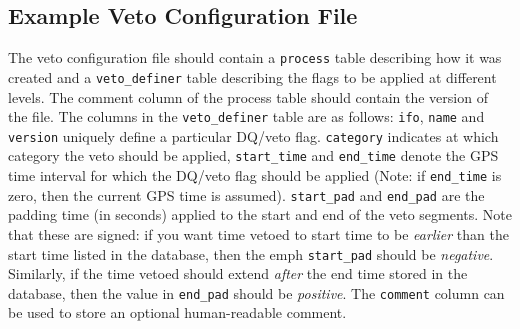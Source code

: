 {\subsection{Example Veto Configuration File}

The veto configuration file should contain a \verb|process| table
describing how it was created and a \verb|veto_definer| table
describing the flags to be applied at different levels. The comment
column of the process table should contain the version of the file.
The columns in the \verb|veto_definer| table are as follows:
\verb|ifo|, \verb|name| and \verb|version| uniquely define a
particular DQ/veto flag. \verb|category| indicates at which category
the veto should be applied, \verb|start_time|
and \verb|end_time| denote the GPS time interval for which the DQ/veto
flag should be applied (Note: if \verb|end_time| is zero, then the
current GPS time is assumed). \verb|start_pad| and \verb|end_pad| are
the padding time (in seconds) applied to the start and end of the veto
segments. Note that these are signed: if you want time vetoed to start
time to be \emph{earlier} than the start time listed in the database,
then the emph \verb|start_pad| should be \emph{negative}. Similarly,
if the time vetoed should extend \emph{after} the end time stored in
the database, then the value in \verb|end_pad| should be
\emph{positive}. The \verb|comment| column can be used to store an
optional human-readable comment.

}
